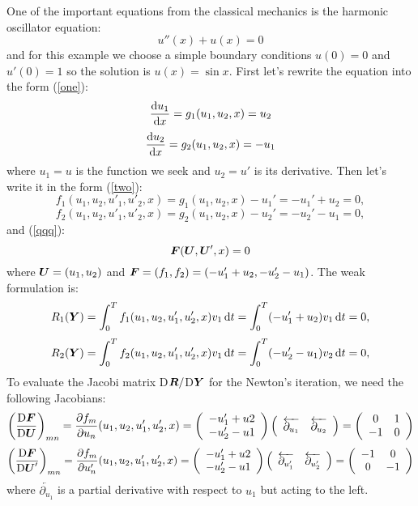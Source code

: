 \documentclass[12pt]{article}
\newcommand{\bfF}{\mbox{\boldmath $F$}}
\newcommand{\bfU}{\mbox{\boldmath $U$}}
\newcommand{\bfY}{\mbox{\boldmath $Y$}}
\newcommand{\bfR}{\mbox{\boldmath $R$}}
\def\d{\mbox{d}}
\begin{document}
One of the important equations from the classical mechanics is the harmonic
oscillator equation:
$$u''(x)+u(x)=0$$
and for this example we choose a simple boundary conditions $u(0)=0$ and
$u'(0)=1$ so the solution is $u(x)=\sin
x$. First let's rewrite the equation into the form (\ref{one}):
$$
{\d u_1\over\d x}=g_1(u_1, u_2, x)=u_2
$$
$$
{\d u_2\over\d x}=g_2(u_1, u_2, x)=-u_1
$$
where $u_1=u$ is the function we seek and $u_2=u'$ is its derivative.
Then let's write it in the form (\ref{two}):
$$
f_1(u_1, u_2, u'_1, u'_2, x) = g_1(u_1, u_2, x)-u_1'=-u_1'+u_2 = 0,
$$
$$
f_2(u_1, u_2, u'_1, u'_2, x) = g_2(u_1, u_2, x)-u_2'=-u_2'-u_1 = 0,
$$
and (\ref{qqq}):
$$
\bfF(\bfU, \bfU', x) = 0
$$
where ${\bfU} = (u_1, u_2)$ and ${\bfF} = (f_1, f_2)=(-u_1'+u_2, -u_2'-u_1)$.
The weak formulation is:
$$
R_1(\bfY) = \int_0^T f_1(u_1, u_2, u'_1, u'_2, x)v_1 \, \d t =
\int_0^T (-u_1'+u_2)v_1 \, \d t
=0,
$$
$$
R_2(\bfY) = \int_0^T f_2(u_1, u_2, u'_1, u'_2, x)v_1 \, \d t =
\int_0^T (-u_2'-u_1)v_2 \, \d t
=0,
$$ To evaluate the Jacobi matrix D$\bfR/$D$\bfY$ for the Newton's iteration, we need the following
Jacobians:
$$
\left({{\rm D}\bfF\over{\rm D}\bfU}\right)_{mn}=
\frac{\partial f_m}{\partial u_n}(u_1, u_2, u'_1, u'_2, x)
=
\left( \begin{array}{c}
-u_1'+u2 \\
-u_2'-u1 \\
\end{array} \right)
\left( \begin{array}{cc}
\overleftarrow{\partial_{u_1}} & \overleftarrow{\partial_{u_2}} \\
\end{array} \right)
=
\left( \begin{array}{cc}
0 & 1 \\
-1 & 0 \\
\end{array} \right)
$$
$$
\left({{\rm D}\bfF\over{\rm D}\bfU'}\right)_{mn}=
\frac{\partial f_m}{\partial u'_n}(u_1, u_2, u'_1, u'_2, x)
=
\left( \begin{array}{c}
-u_1'+u2 \\
-u_2'-u1 \\
\end{array} \right)
\left( \begin{array}{cc}
\overleftarrow{\partial_{u_1'}} & \overleftarrow{\partial_{u_2'}} \\
\end{array} \right)
=
\left( \begin{array}{cc}
-1 & 0 \\
0 & -1 \\
\end{array} \right)
$$
where $\overleftarrow{\partial_{u_1}}$ is a partial derivative with respect to
$u_1$ but acting to the left.
\end{document}
